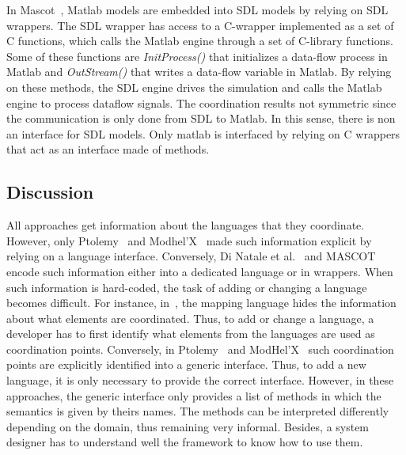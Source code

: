 In Mascot~\cite{mascotbib}, Matlab models are embedded into SDL models by relying on SDL wrappers. The SDL wrapper has access to a C-wrapper implemented as a set of C functions, which calls the Matlab engine through a set of C-library functions. Some of these functions are \emph{InitProcess()} that initializes a data-flow process in Matlab and \emph{OutStream()} that writes a data-flow variable in Matlab. By relying on these methods, the SDL engine drives the simulation and calls the Matlab engine to process dataflow signals. The coordination results not symmetric since the communication is only done from SDL to Matlab. In this sense, there is non an interface for SDL models. Only matlab is interfaced by relying on C wrappers that act as an interface made of methods.
\subsection{Discussion}
All approaches get information about the languages that they coordinate. However, only Ptolemy~\cite{ptoleframebib} and Modhel'X~\cite{modhelxbib} made such information explicit by relying on a language interface. Conversely, Di Natale et al.~\cite{dinatale} and MASCOT~\cite{mascotbib} encode such information either into a dedicated language or in wrappers. When such information is hard-coded, the task of adding or changing a language becomes difficult. For instance, in~\cite{dinatale}, the mapping language hides the information about what elements are coordinated. Thus, to add or change a language, a developer has to first identify what elements from the languages are used as coordination points. Conversely, in Ptolemy~\cite{ptoleframebib} and ModHel'X~\cite{modhelxbib} such coordination points are explicitly identified into a generic interface. Thus, to add a new language, it is only necessary to provide the correct interface. However, in these approaches, the generic interface only provides a list of methods in which the semantics is given by theirs names. The methods can be interpreted differently depending on the domain, thus remaining very informal. Besides, a system designer has to understand well the framework to know how to use them. 

